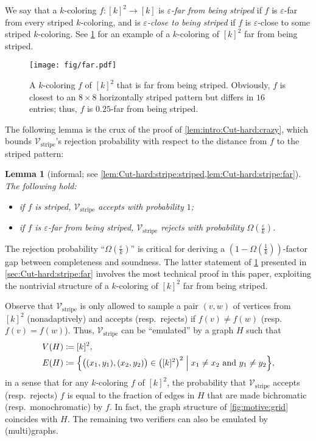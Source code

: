 \documentclass[11pt,fleqn]{article}
\renewcommand{\epsilon}{\varepsilon}
\newcommand{\defeq}{\coloneq}
\newcommand{\V}{\calV}
\newcommand{\f}{f}
\newcommand{\Vstripe}{\V_\mathrm{stripe}}
\newcommand{\calV}{\mathcal{V}}
\newtheorem{lemma}[theorem]{Lemma}
\theoremstyle{definition}
\numberwithin{equation}{section}
\begin{document}
\noindent
We say that a $k$-coloring $\f \colon [k]^2 \to [k]$
is \emph{$\epsilon$-far from being striped} if
$\f$ is $\epsilon$-far from every striped $k$-coloring, and
is \emph{$\epsilon$-close to being striped} if
$\f$ is $\epsilon$-close to some striped $k$-coloring.
See \cref{fig:far} for an example of a $k$-coloring of $[k]^2$ far from being striped.


\begin{figure}
    \centering
    \texttt{[image: fig/far.pdf]}
    \caption{
        A $k$-coloring $\f$ of $[k]^2$ that is far from being striped.
        Obviously, $\f$ is closest to an $8 \times 8$ horizontally striped pattern but 
        differs in $16$ entries; thus, $\f$ is $0.25$-far from being striped.
    }
    \label{fig:far}
\end{figure}
 

The following lemma is the crux of the proof of \cref{lem:intro:Cut-hard:crazy},
which bounds $\Vstripe$'s rejection probability with respect to the distance from $\f$ to the striped pattern:

\begin{lemma}[informal; see \cref{lem:Cut-hard:stripe:striped,lem:Cut-hard:stripe:far}]
\label{lem:intro:Cut-hard:stripe}
The following hold\textup{:}
\begin{itemize}
    \item
    if $f$ is striped,
    $\Vstripe$ accepts with probability $1$\textup{;}
    \item
    if $f$ is $\epsilon$-far from being striped,
    $\Vstripe$ rejects with probability
    $\Omega\left(\frac{\epsilon}{k}\right)$.
\end{itemize}
\end{lemma}\noindent
The rejection probability ``$\Omega\left(\frac{\epsilon}{k}\right)$'' is critical for deriving
a $\left(1-\Omega\left(\frac{1}{k}\right)\right)$-factor gap between completeness and soundness.
The latter statement of \cref{lem:intro:Cut-hard:stripe} presented in \cref{sec:Cut-hard:stripe:far}
involves the most technical proof in this paper,
exploiting the nontrivial structure of a $k$-coloring of $[k]^2$ far from being striped.


Observe that $\Vstripe$ is only allowed to
sample a pair $(v,w)$ of vertices from $[k]^2$ (nonadaptively) and
accepts (resp.~rejects) if $\f(v) \neq f(w)$ (resp.~$\f(v) = \f(w)$).
Thus, $\Vstripe$ can be ``emulated'' by a graph $H$ such that
\begin{align}
    V(H) & \defeq [k]^2, \\
    E(H) & \defeq \Bigl\{
        \bigl((x_1, y_1), (x_2, y_2)\bigr) \in \left([k]^2\right)^2
        \Bigm| x_1 \neq x_2 \text{ and } y_1 \neq y_2
    \Bigr\},
\end{align}
in a sense that 
for any $k$-coloring $\f$ of $[k]^2$,
the probability that $\Vstripe$ accepts (resp.~rejects) $\f$
is equal to
the fraction of edges in $H$ that are made bichromatic (resp.~monochromatic) by $\f$.
In fact, the graph structure of \cref{fig:motive:grid} coincides with $H$.
The remaining two verifiers can also be emulated by (multi)graphs.
\end{document}
